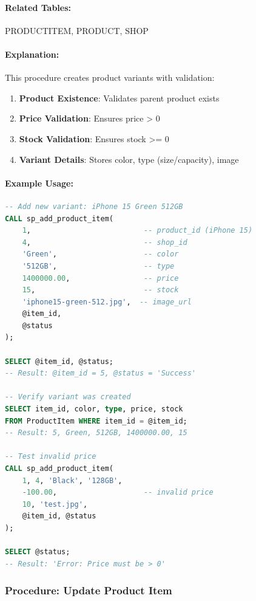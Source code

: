 \paragraph{Related Tables:} PRODUCTITEM, PRODUCT, SHOP

\paragraph{Explanation:}
This procedure creates product variants with validation:
\begin{enumerate}
    \item \textbf{Product Existence}: Validates parent product exists
    \item \textbf{Price Validation}: Ensures price > 0
    \item \textbf{Stock Validation}: Ensures stock >= 0
    \item \textbf{Variant Details}: Stores color, type (size/capacity), image
\end{enumerate}

\paragraph{Example Usage:}

\begin{lstlisting}[language=SQL]
-- Add new variant: iPhone 15 Green 512GB
CALL sp_add_product_item(
    1,                          -- product_id (iPhone 15)
    4,                          -- shop_id
    'Green',                    -- color
    '512GB',                    -- type
    1400000.00,                 -- price
    15,                         -- stock
    'iphone15-green-512.jpg',  -- image_url
    @item_id,
    @status
);

SELECT @item_id, @status;
-- Result: @item_id = 5, @status = 'Success'

-- Verify variant was created
SELECT item_id, color, type, price, stock 
FROM ProductItem WHERE item_id = @item_id;
-- Result: 5, Green, 512GB, 1400000.00, 15

-- Test invalid price
CALL sp_add_product_item(
    1, 4, 'Black', '128GB',
    -100.00,                    -- invalid price
    10, 'test.jpg',
    @item_id, @status
);

SELECT @status;
-- Result: 'Error: Price must be > 0'
\end{lstlisting}

\subsubsection{Procedure: Update Product Item}

